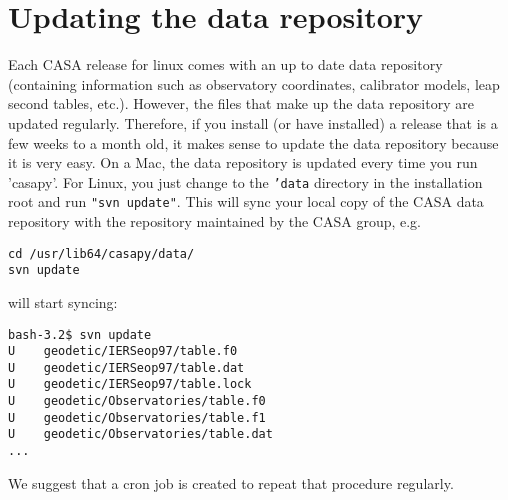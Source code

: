 \section{Updating the data repository}
\label{section:install.datarep}


Each CASA release for linux comes with an up to date data repository
(containing information such as observatory coordinates, calibrator
models, leap second tables, etc.). However, the files that make up the
data repository are updated regularly. Therefore, if you install (or
have installed) a release that is a few weeks to a month old, it makes
sense to update the data repository because it is very easy. On a Mac,
the data repository is updated every time you run 'casapy'. For Linux,
you just change to the {\tt 'data} directory in the installation root and
run {\tt "svn update"}. This will sync your local copy of the CASA data
repository with the repository maintained by the CASA group, e.g. 

\small
\begin{verbatim}
cd /usr/lib64/casapy/data/
svn update
\end{verbatim}
\normalsize

will start syncing:

\small
\begin{verbatim}
bash-3.2$ svn update
U    geodetic/IERSeop97/table.f0
U    geodetic/IERSeop97/table.dat
U    geodetic/IERSeop97/table.lock
U    geodetic/Observatories/table.f0
U    geodetic/Observatories/table.f1
U    geodetic/Observatories/table.dat
...
\end{verbatim}
\normalsize

We suggest that a cron job is created to repeat that procedure
regularly. 


